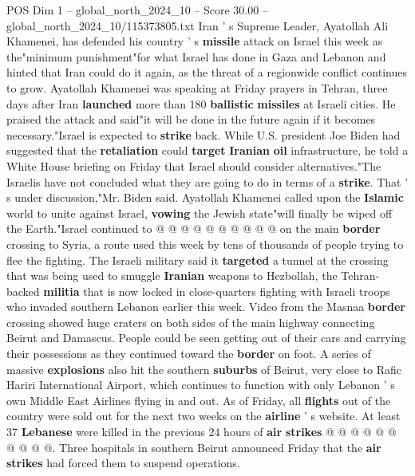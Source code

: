 \begin{textsample}{POS Dim 1 – global\_north\_2024\_10 – Score 30.00 – global\_north\_2024\_10/115373805.txt}  \label{ex:f1_pos_082}
Iran ' s Supreme Leader, Ayatollah Ali Khamenei, has defended his country ' s \textbf{missile} attack on Israel this week as the"minimum punishment"for what Israel has done in Gaza and Lebanon and hinted that Iran could do it again, as the threat of a regionwide conflict continues to grow.
Ayatollah Khamenei was speaking at Friday prayers in Tehran, three days after Iran \textbf{launched} more than 180 \textbf{ballistic} \textbf{missiles} at Israeli cities.
He praised the attack and said"it will be done in the future again if it becomes necessary."Israel is expected to \textbf{strike} back.
While U.S. president Joe Biden had suggested that the \textbf{retaliation} could \textbf{target} \textbf{Iranian} \textbf{oil} infrastructure, he told a White House briefing on Friday that Israel should consider alternatives."The Israelis have not concluded what they are going to do in terms of a \textbf{strike}.
That ' s under discussion,"Mr.
Biden said.
Ayatollah Khamenei called upon the \textbf{Islamic} world to unite against Israel, \textbf{vowing} the Jewish state"will finally be wiped off the Earth."Israel continued to @ @ @ @ @ @ @ @ @ @ on the main \textbf{border} crossing to Syria, a route used this week by tens of thousands of people trying to flee the fighting.
The Israeli military said it \textbf{targeted} a tunnel at the crossing that was being used to smuggle \textbf{Iranian} weapons to Hezbollah, the Tehran-backed \textbf{militia} that is now locked in close-quarters fighting with Israeli troops who invaded southern Lebanon earlier this week.
Video from the Masnaa \textbf{border} crossing showed huge craters on both sides of the main highway connecting Beirut and Damascus.
People could be seen getting out of their cars and carrying their possessions as they continued toward the \textbf{border} on foot.
A series of massive \textbf{explosions} also hit the southern \textbf{suburbs} of Beirut, very close to Rafic Hariri International Airport, which continues to function with only Lebanon ' s own Middle East Airlines flying in and out.
As of Friday, all \textbf{flights} out of the country were sold out for the next two weeks on the \textbf{airline} ' s website.
At least 37 \textbf{Lebanese} were killed in the previous 24 hours of \textbf{air} \textbf{strikes} @ @ @ @ @ @ @ @ @ @.
Three hospitals in southern Beirut announced Friday that the \textbf{air} \textbf{strikes} had forced them to suspend operations.

\end{textsample}

